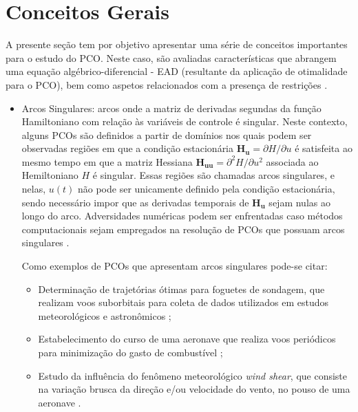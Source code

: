 
\section{Conceitos Gerais}

A presente seção tem por objetivo apresentar uma série de conceitos importantes para o estudo do PCO. Neste caso, são avaliadas características que abrangem uma equação algébrico-diferencial - EAD (resultante da aplicação de otimalidade para o PCO), bem como aspetos relacionados com a presença de restrições \cite{bryson_optimal_1996,lobato2004}.

\begin{itemize}

\item Arcos Singulares: arcos onde a matriz de derivadas segundas da função  Hamiltoniano com relação às variáveis de controle é singular. Neste contexto, alguns PCOs são definidos a partir de domínios nos quais podem ser observadas regiões em que a condição estacionária $ \mathbf{H_{u}} = \partial \mathit{H} / \partial u $ é satisfeita ao mesmo tempo em que a matriz Hessiana $ \mathbf{H_{uu}} = \partial^2 \mathit{H} / \partial u^2 $ associada ao Hemiltoniano $ \mathit{H} $ é singular. Essas regiões são chamadas arcos singulares, e nelas, $ u(t) $ não pode ser unicamente definido pela condição estacionária, sendo necessário impor que as derivadas temporais de $ \mathbf{H_{u}} $ sejam nulas ao longo do arco. Adversidades numéricas podem ser enfrentadas caso métodos computacionais sejam empregados na resolução de PCOs que possuam arcos singulares \cite{betts_practical_2001, becerra_optimal_2008}.

Como exemplos de PCOs que apresentam arcos singulares pode-se citar: 
%
\begin{itemize}
	\item Determinação de trajetórias ótimas para foguetes de sondagem, que realizam voos suborbitais para coleta de dados utilizados em estudos meteorológicos e astronômicos \cite{nasa_what_2004};
	
	\item Estabelecimento do curso de uma aeronave que realiza voos periódicos para minimização do gasto de combustível \cite{speyer_periodic_1996};
	
	\item Estudo da influência do fenômeno meteorológico \textit{wind shear}, que consiste na variação brusca da direção e/ou velocidade do vento, no pouso de uma aeronave \cite{anac_wind_2018}.
\end{itemize}


\end{itemize}
